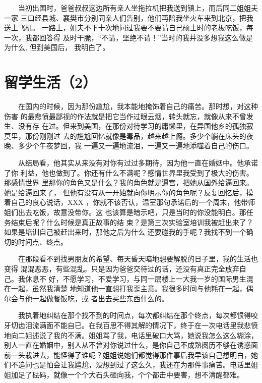 \documentclass[12pt]{book}
\begin{document}
　　当初出国时，爸爸叔叔这边所有亲人坐拖拉机把我送到镇上，而后同二姐姐夫一家
三口经县城、襄樊市分别同亲人们告别，他们再陪我坐火车来到北京，把我送上飞机。
一路上，姐夫不下十次地问过我要不要请自己硕士时的老板吃饭，每一次，我都回答得
及时干脆，“不请，坚绝不请！”当时的我并没多想我这么做是为什么, 但到美国后，
我明白了。
\section{留学生活（2）}
\label{sec-6-2}

　　在国内的时候，因为那份尴尬，我本能地掩饰着自己的痛苦。那时想，对这种伤害
的最悲愤最鄙视的作法就是把它当作过眼云烟，转头就忘，就像从来不曾发生、没有存
在过。但来到美国，在那份对待学习的庸懒里，在异国他乡的孤独寂莫里，那份刚刚过
去的尴尬回忆就像是毒品，越来越上瘾。多少个躺在床头的夜晚、多少个午夜梦回，我
一遍又一遍地流泪，一遍又一遍地添噬着自己的伤口。

　　从结局看，他其实从来没有对你有过过多期待，因为他一直在婚姻中。他承诺了你
利益，他也做到了。你还有什么不满呢？感情世界里我受到了极大的伤害。那感情世界
里那你的角色又是什么？我的角色就是逼宫，把她从国外给逼回来。她是给逼回来了，
但他有没有从一开始就向你明示你的角色呢？反复回忆后，摸着自己的良心说话，XXX
，你就不该否认，温室那句承诺后的一个周末，他带师姐们出去吃饭，故意没带你。这
也该算是暗示吧，只是当时的你没能明白。那任务结束后呢？什么时候是真正故事的结
束？是第三次实验室培训我被赶出来了？如果是培训自己被赶出来时，那他之后为什么
还要碰我的手呢？我找不到一个确切的时间点、终点。

　　在那段看不到找男朋友的希望、每天昏天暗地想要解脱的日子里，我的生活也变得
混混恶恶，有些混乱。只是因为爸爸交待过的话，还没有真正完全放弃自己。我休息不
好，不愿学习，不爱学习，与同一层楼上一大我一岁的国际男生混在一起，虽然我清楚
地知道他一直想打我歪主意。我很多时间与他耗在一起，偶尔会与他一起做餐饭吃，或
者出去买些东西什么的。

　　我执着地纠结在那个找不到的时间点，每次都纠结在那个终点，每次都恨得咬牙切齿泪流满面不能自已。在我百思不得其解的情况下，终于在一次电话里我悲愤地向二姐述说了我的不满。姐姐骂了我，电话里破口大骂，她说我怎么这么糊涂，别人一直在婚姻中，别人从不曾对你说过什么，是你自己不成熟阅历不够在诱惑面前一头栽进去，能怪得了谁呢？姐姐说她们都觉得那件事后我早该自己想明白，她们不追问也是怕会让我尴尬，没想到过了这么久，我还在为那件事痛苦。电话里姐姐加足了砝码，就像一个个大石头砸向我，个个都击中要害，想不清醒都难。
\end{document}
